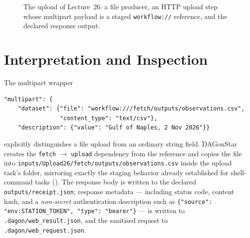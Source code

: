 \begin{figure}[h]
\centering
{}
\caption{The upload of Lecture~26: a file producer, an HTTP upload step whose
multipart payload is a staged \texttt{workflow://} reference, and the declared
response output.}
\label{fig:web-task-flow}
\end{figure}

\section{Interpretation and Inspection}

The multipart wrapper

\begin{lstlisting}
"multipart": {
    "dataset": {"file": "workflow:///fetch/outputs/observations.csv",
                "content_type": "text/csv"},
    "description": {"value": "Gulf of Naples, 2 Nov 2026"}}
\end{lstlisting}

explicitly distinguishes a file upload from an ordinary string field.
DAGonStar creates the \texttt{fetch} $\to$ \texttt{upload} dependency from
the reference and copies the file into
\texttt{inputs/Upload26/fetch/outputs/observations.csv} inside the upload
task's folder, mirroring exactly
the staging behavior already established for shell-command tasks
(). The response body is written to the declared
\texttt{outputs/receipt.json}; response metadata --- including status code,
content hash, and a \emph{non-secret} authentication description such as
\texttt{\{"source": "env:STATION\_TOKEN", "type": "bearer"\}} --- is written
to \texttt{.dagon/web\_result.json}, and the sanitised request to
\texttt{.dagon/web\_request.json}.

